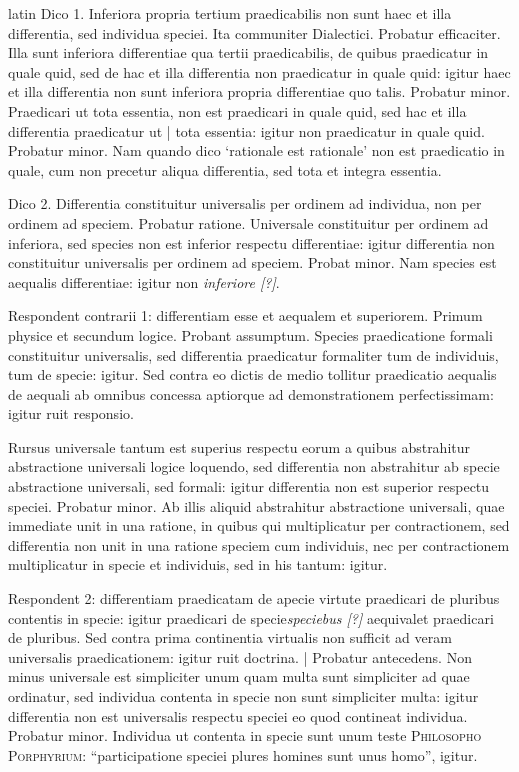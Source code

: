 \begin{otherlanguage*}{latin}
\pstart
Dico 1. Inferiora propria tertium praedicabilis non sunt haec et illa differentia, sed individua speciei. Ita communiter Dialectici. Probatur efficaciter. Illa sunt inferiora differentiae qua tertii praedicabilis, de quibus praedicatur in quale quid, sed de hac et illa differentia non praedicatur in quale quid:
igitur haec et illa differentia non sunt inferiora propria differentiae quo talis. Probatur minor. Praedicari ut tota essentia, non est praedicari in quale quid, sed hac et illa differentia praedicatur ut \textnormal{|}  tota essentia:
igitur non praedicatur in quale quid. Probatur minor. Nam quando dico `rationale est rationale' non est praedicatio in quale, cum non precetur aliqua differentia, sed tota et integra essentia. 
\pend

\pstart
Dico 2.  Differentia constituitur universalis per ordinem ad individua, non per ordinem ad speciem. Probatur ratione. Universale constituitur per ordinem ad inferiora, sed species non est inferior respectu differentiae:
igitur differentia non constituitur universalis per ordinem ad speciem. Probat minor. Nam species est aequalis differentiae:
igitur non \emph{inferiore [?]}. 
\pend

\pstart
Respondent contrarii 1:
differentiam esse et aequalem et superiorem. Primum physice et secundum logice. Probant assumptum. Species praedicatione formali constituitur universalis, sed differentia praedicatur formaliter tum de individuis, tum de specie:
igitur. Sed contra eo dictis de medio tollitur praedicatio aequalis de aequali ab omnibus concessa aptiorque ad demonstrationem perfectissimam:
igitur ruit responsio. 
\pend

\pstart
Rursus universale tantum est superius respectu eorum a quibus abstrahitur abstractione universali logice loquendo, sed differentia non abstrahitur ab specie abstractione universali, sed formali:
igitur differentia non est superior respectu speciei. Probatur minor. Ab illis aliquid abstrahitur abstractione universali, quae immediate unit in una ratione, in quibus qui multiplicatur per contractionem, sed differentia non unit in una ratione speciem cum individuis, nec per contractionem multiplicatur in specie et individuis, sed in his tantum:
igitur. 
\pend

\pstart
Respondent 2:
differentiam praedicatam de apecie virtute praedicari de pluribus contentis in specie:
igitur praedicari de specie\emph{speciebus [?]} aequivalet praedicari de pluribus. Sed contra prima continentia virtualis non sufficit ad veram universalis praedicationem:
igitur ruit doctrina. \textnormal{|} Probatur antecedens. Non minus universale est simpliciter unum quam multa sunt simpliciter ad quae ordinatur, sed individua contenta in specie non sunt simpliciter multa:
igitur differentia non est universalis respectu speciei eo quod contineat individua. Probatur minor. Individua ut contenta in specie sunt unum teste \textsc{Philosopho} \textsc{Porphyrium}:
\enquote{participatione speciei plures homines sunt unus homo}, igitur. 
\pend


\end{otherlanguage*}
